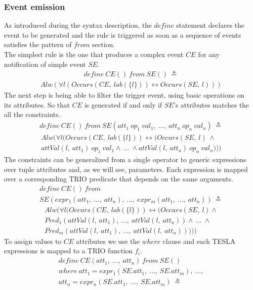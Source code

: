 \subsubsection{Event emission}
As introduced during the syntax description, the $define$ statement declares the event to be generated and the rule is triggered as soon as a sequence of events satisfies the pattern of $from$ section.\\
The simplest rule is the one that produces a complex event $CE$ for any notification of simple event $SE$.
\begin{align*}
&define\ CE()\ from\ SE()\ \triangleq
\end{align*}
\begin{align*}
&Alw(\forall l(Occurs(CE,\ lab(\{l\})) \leftrightarrow Occurs(SE,\ l)))
\end{align*}
The next step is being able to filter the trigger event, using basic operations on its attributes. So that $CE$ is generated if and only if $SE$'s attributes matches the all the constraints.
\begin{align*}
&define\ CE()\ from\ SE(att_1\ op_1\ val_1,\ ...,\ att_n\ op_n\ val_n)\ \triangleq
\end{align*}
\begin{align*}
&Alw(\forall l(Occurs(CE,\ lab(\{l\})) \leftrightarrow (Occurs(SE,\ l)\ \wedge\\
&attVal(l,\ att_1)\ op_1\ val_1 \wedge\ ...\ \wedge attVal(l,\ att_n)\ op_n\ val_n)))
\end{align*}
The constraints can be generalized from a single operator to generic expressions over tuple attributes and, as we will see, parameters. Each expression is mapped over a corresponding TRIO predicate that depends on the same arguments.
\begin{align*}
&define\ CE()\ from\\
&SE(expr_1(att_1,\ ...,\ att_n),\ ...,\ expr_m(att_1,\ ...,\ att_n))\ \triangleq
\end{align*}
\begin{align*}
&Alw(\forall l (Occurs(CE,\ lab(\{l\})) \leftrightarrow (Occurs(SE,\ l) \wedge\\
&Pred_1(attVal(l,\ att_1),\ ...,\ attVal(l,\ att_n)) \wedge\ ...\ \wedge\\
&Pred_m(attVal(l,\ att_1),\ ...,\ attVal(l,\ att_n)))))
\end{align*}
To assign values to $CE$ attributes we use the $where$ clause and each TESLA expressions is mapped to a TRIO function $f_i$.
\begin{align*}
&define\ CE(att_1,\ ...,\ att_n)\ from\ SE()\\
&where\ att_1 = expr_1(SE.att_1,\ ...,\ SE.att_m),\ ...,\\
&att_n = expr_n(SE.att_1,\ ...,\ SE.att_m)\ \triangleq
\end{align*}
